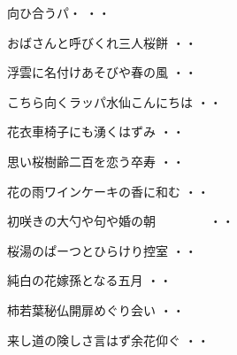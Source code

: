 \begin{shiika}向ひ合うパ・
\hfill{・・}\end{shiika}
\vspace{0.6cm}
\begin{shiika}おばさんと呼びくれ三人桜餅
\hfill{・・}\end{shiika}
\vspace{0.6cm}
\begin{shiika}浮雲に名付けあそびや春の風
\hfill{・・}\end{shiika}
\vspace{0.6cm}
\begin{shiika}こちら向くラッパ水仙こんにちは
\hfill{・・}\end{shiika}
\vspace{0.6cm}
\begin{shiika}花衣車椅子にも湧くはずみ
\hfill{・・}\end{shiika}
\vspace{0.6cm}
\begin{shiika}思い桜樹齢二百を恋う卒寿
\hfill{・・}\end{shiika}
\vspace{0.6cm}
\begin{shiika}花の雨ワインケーキの香に和む
\hfill{・・}\end{shiika}
\vspace{0.6cm}
\begin{shiika}初咲きの大勺や句や婚の朝　　　　
\hfill{・・}\end{shiika}
\vspace{0.6cm}
\begin{shiika}桜湯のぱーつとひらけり控室
\hfill{・・}\end{shiika}
\vspace{0.6cm}
\begin{shiika}純白の花嫁孫となる五月
\hfill{・・}\end{shiika}
\vspace{0.6cm}
\begin{shiika}柿若葉秘仏開扉めぐり会い
\hfill{・・}\end{shiika}
\vspace{0.6cm}
\begin{shiika}来し道の険しさ言はず余花仰ぐ
\hfill{・・}\end{shiika}
